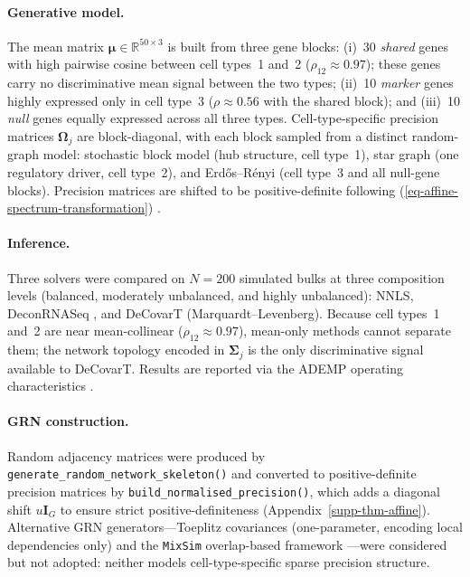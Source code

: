 \documentclass[pdflatex, sn-nature]{sn-jnl}
\theoremstyle{thmstyleone}%
\theoremstyle{thmstyletwo}%
\theoremstyle{thmstylethree}%
\begin{document}
    \paragraph{Generative model.}
    The mean matrix $\boldsymbol{\mu}\in\mathbb{R}^{50\times 3}$ is
    built from three gene blocks:
    (i)~30 \emph{shared} genes with high pairwise cosine between cell
    types~1 and~2 ($\rho_{12}\approx 0.97$); these genes carry no
    discriminative mean signal between the two types;
    (ii)~10 \emph{marker} genes highly expressed only in cell type~3
    ($\rho\approx 0.56$ with the shared block); and
    (iii)~10 \emph{null} genes equally expressed across all three types.
    Cell-type-specific precision matrices $\boldsymbol{\Omega}_{j}$ are
    block-diagonal, with each block sampled from a distinct random-graph
    model: stochastic block model (hub structure, cell type~1), star graph
    (one regulatory driver, cell type~2), and Erd\H{o}s--R\'enyi (cell
    type~3 and all null-gene blocks).  Precision matrices are shifted to
    be positive-definite following (\ref{eq-affine-spectrum-transformation})
    \cite{chiquetVariationalInferenceSparse2018}.

    \paragraph{Inference.}
    Three solvers were compared on $N=200$ simulated bulks at three
    composition levels (balanced, moderately unbalanced, and highly
    unbalanced): NNLS, DeconRNASeq
    \cite{gongDeconRNASeqStatisticalFramework2013}, and DeCovarT
    (Marquardt--Levenberg).  Because cell types~1 and~2 are near
    mean-collinear ($\rho_{12}\approx 0.97$), mean-only methods
    cannot separate them; the network topology encoded in
    $\boldsymbol{\Sigma}_{j}$ is the only discriminative signal available
    to DeCovarT.  Results are reported via the ADEMP operating
    characteristics \cite{morrisUsingSimulationStudies2019}.

    \paragraph{GRN construction.}
    Random adjacency matrices were produced by
    \texttt{generate\_random\_network\_skeleton()} and converted to
    positive-definite precision matrices by
    \texttt{build\_normalised\_precision()}, which adds a diagonal shift
    $u\boldsymbol{I}_{G}$ to ensure strict positive-definiteness
    (Appendix~\ref{supp-thm-affine}).  Alternative GRN generators---Toeplitz
    covariances (one-parameter, encoding local dependencies only) and
    the \texttt{MixSim} overlap-based framework
    \cite{melnykovMixSimPackageSimulating2012}---were considered but not
    adopted: neither models cell-type-specific sparse precision structure.
\end{document}
